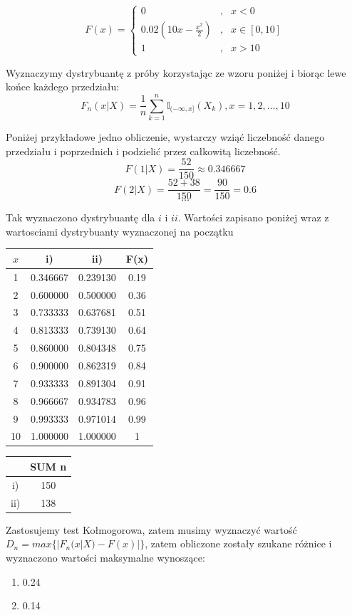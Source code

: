 \documentclass{article}
\begin{document}
\[ F(x) = \left\{ \begin{array}{ccc}
0 & , & x < 0 \\
0.02(10x - \frac{x^2}{2}) & , & x \in [0,10] \\
1 & , & x > 10
\end{array} \right. \]

Wyznaczymy dystrybuantę z próby korzystając ze wzoru poniżej i biorąc lewe końce każdego przedziału:
\[ F_n(x|X) = \frac{1}{n} \sum_{k=1}^n \mathbb{I}_{(-\infty,x]}(X_k), x = 1,2,\dots, 10 \]

Poniżej przykładowe jedno obliczenie, wystarczy wziąć liczebność danego przedziału i poprzednich i podzielić przez całkowitą liczebność.
\[ F(1|X) = \frac{52}{150} \approx 0.346667 \]
\[ F(2|X) = \frac{52 + 38}{150} = \frac{90}{150} = 0.6 \] 
\[ \dots \]

Tak wyznaczono dystrybuantę dla $i$ i $ii$. Wartości zapisano poniżej wraz z wartosciami dystrybuanty wyznaczonej na początku
\begin{center} \begin{tabular}{|c|c|c|c|} \hline
$x$ & i) & ii) & F(x) \\ \hline
1 & 0.346667 & 0.239130 & 0.19\\ \hline
2 & 0.600000 & 0.500000 & 0.36\\ \hline
3 & 0.733333 & 0.637681 & 0.51\\ \hline
4 & 0.813333 & 0.739130 & 0.64\\ \hline
5 & 0.860000 & 0.804348 & 0.75\\ \hline
6 & 0.900000 & 0.862319 & 0.84\\ \hline
7 & 0.933333 & 0.891304 & 0.91\\ \hline
8 & 0.966667 & 0.934783 & 0.96\\ \hline
9 & 0.993333 & 0.971014 & 0.99\\ \hline
10 & 1.000000 & 1.000000 & 1\\ \hline
\end{tabular} \end{center}

\begin{center} \begin{tabular}{|c|c|} \hline
 & SUM n \\ \hline
i) & 150 \\ \hline
ii) & 138 \\ \hline
\end{tabular} \end{center}

Zastosujemy test Kołmogorowa, zatem musimy wyznaczyć wartość $D_n = max\{ |F_n(x|X) - F(x) | \}$, zatem obliczone zostały szukane różnice i wyznaczono wartości maksymalne wynoszące:
\begin{enumerate}[label = \roman*)]
\item 0.24
\item 0.14
\end{enumerate}
\end{document}
